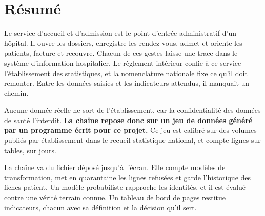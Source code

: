 %
%
%
%
%

\chapter*{Résumé}

Le service d'accueil et d'admission est le point d'entrée administratif d'un hôpital. Il ouvre les
dossiers, enregistre les rendez-vous, admet et oriente les patients, facture et recouvre. Chacun de
ces gestes laisse une trace dans le système d'information hospitalier. Le règlement intérieur confie
à ce service l'établissement des statistiques, et la nomenclature nationale fixe ce qu'il doit
remonter. Entre les données saisies et les indicateurs attendus, il manquait un chemin.

Aucune donnée réelle ne sort de l'établissement, car la confidentialité des données de santé
l'interdit. \textbf{La chaîne repose donc sur un jeu de données généré par un programme écrit pour
ce projet.} Ce jeu est calibré sur des volumes publiés par établissement dans le recueil statistique
national, et compte  lignes sur  tables, sur
 jours.

La chaîne va du fichier déposé jusqu'à l'écran. Elle compte  modèles de
transformation, met en quarantaine les lignes refusées et garde l'historique des fiches patient. Un
modèle probabiliste rapproche les identités, et il est évalué contre une vérité terrain connue. Un
tableau de bord de  pages restitue  indicateurs, chacun
avec sa définition et la décision qu'il sert.

